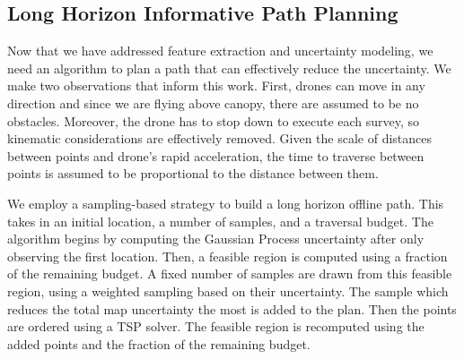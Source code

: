 \subsection{Long Horizon Informative Path Planning}
Now that we have addressed feature extraction and uncertainty modeling, we need an algorithm to plan a path that can effectively reduce the uncertainty. We make two observations that inform this work. First, drones can move in any direction and since we are flying above canopy, there are assumed to be no obstacles. Moreover, the drone has to stop down to execute each survey, so kinematic considerations are effectively removed. Given the scale of distances between points and drone's rapid acceleration, the time to traverse between points is assumed to be proportional to the distance between them.  



We employ a sampling-based strategy to build a long horizon offline path. This takes in an initial location, a number of samples, and a traversal budget. The algorithm begins by computing the Gaussian Process uncertainty after only observing the first location. Then, a feasible region is computed using a fraction of the remaining budget. A fixed number of samples are drawn from this feasible region, using a weighted sampling based on their uncertainty. The sample which reduces the total map uncertainty the most is added to the plan. Then the points are ordered using a TSP solver. The feasible region is recomputed using the added points and the fraction of the remaining budget.

